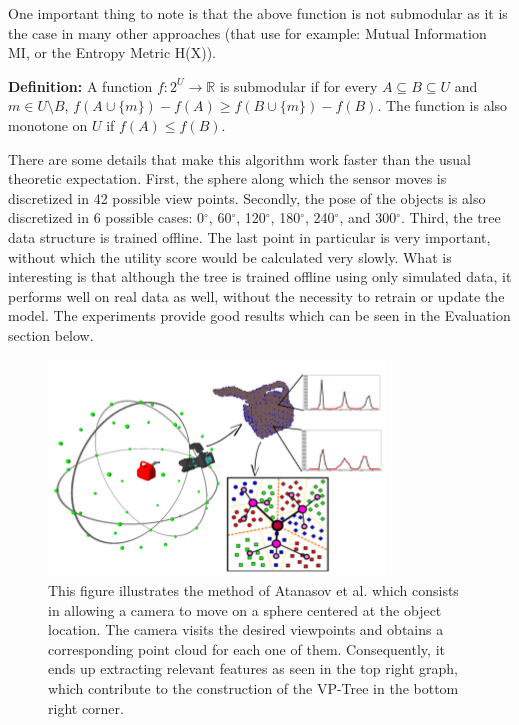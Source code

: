 \documentclass[a4paper,11pt,english]{article}
\begin{document}
One important thing to note is that the above function is not submodular as it is the case in many other approaches (that use for example: Mutual Information MI, or the Entropy Metric H(X)).

\textbf{Definition:}
A function $f:2^U \rightarrow \mathbb{R}$  is submodular if for every $A\subseteq B \subseteq U$ and $m \in U \setminus B$, $f(A \cup\{m\})-f(A)\geqslant f(B \cup\{m\})-f(B)$. The function is also monotone on $U$ if $f(A) \leqslant f(B)$.

There are some details that make this algorithm work faster than the usual theoretic expectation. First, the sphere along which the sensor moves is discretized in 42 possible view points. Secondly, the pose of the objects is also discretized in 6 possible cases: 0$^{\circ}$, 60$^{\circ}$, 120$^{\circ}$, 180$^{\circ}$, 240$^{\circ}$, and 300$^{\circ}$. Third, the tree data structure is trained offline. The last point in particular is very important, without which the utility score would be calculated very slowly. What is interesting is that although the tree is trained offline using only simulated data, it performs well on real data as well, without the necessity to retrain or update the model. The experiments provide good results which can be seen in the Evaluation section below.

\begin{figure}[H]

  
  \centering
    \includegraphics[scale=0.7]{atanasovmethod1.png}
    \caption{
  This figure illustrates the method of Atanasov et al. \cite{atanasov2014nonmyopic} which consists in allowing a camera to move on a sphere centered at the object location. The camera visits the desired viewpoints and obtains a corresponding point cloud for each one of them. Consequently, it ends up extracting relevant features as seen in the top right graph, which contribute to the construction of the VP-Tree in the bottom right corner. }
  
  \label{atanasovmethod1}
\end{figure}
\end{document}
